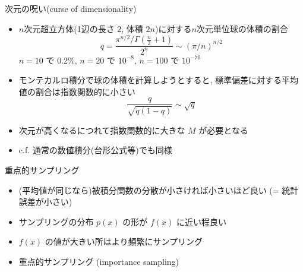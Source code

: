 \documentclass[dvipdfmx]{beamer}
\begin{document}
\begin{frame}[t,fragile]{次元の呪い(curse of dimensionality)}
  \begin{itemize}
  \item $n$次元超立方体(1辺の長さ 2, 体積 $2n$)に対する$n$次元単位球の体積の割合
    \[
    q = \frac{\pi^{n/2} / \Gamma(\frac{n}{2}+1)}{2^n} \sim (\pi/n)^{n/2}
    \]
    $n=10$ で 0.2\%, $n=20$ で $10^{-8}$, $n=100$ で $10^{-70}$
  \item モンテカルロ積分で球の体積を計算しようとすると, 標準偏差に対する平均値の割合は指数関数的に小さい
    \[
    \frac{q}{\sqrt{q(1-q)}} \sim \sqrt{q}
    \]
  \item 次元が高くなるにつれて指数関数的に大きな $M$ が必要となる
  \item c.f. 通常の数値積分(台形公式等)でも同様
  \end{itemize}
\end{frame}

\begin{frame}[t,fragile]{重点的サンプリング}
  \begin{itemize}
    \setlength{\itemsep}{1em}
  \item (平均値が同じなら)被積分関数の分散が小さければ小さいほど良い (= 統計誤差が小さい)
  \item サンプリングの分布 $p(x)$ の形が $f(x)$ に近い程良い
  \item $f(x)$ の値が大きい所はより頻繁にサンプリング
  \item 重点的サンプリング (importance sampling)
  \end{itemize}
\end{frame}
\end{document}
